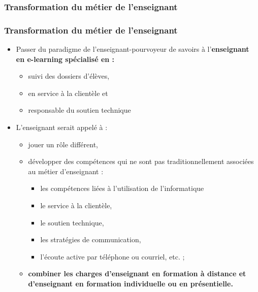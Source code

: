 					\subsubsection{Transformation du métier de l'enseignant} 
						\begin{frame}[allowframebreaks]
						\frametitle{Transformation du métier de l'enseignant}
                        			
                        			\begin{itemize}
                        			\item Passer du paradigme de l’enseignant-pourvoyeur de savoirs à l’\textbf{enseignant en e-learning spécialisé en :}
                        				\begin{itemize}
                        				\item suivi des dossiers d’élèves, 
                        				\item en service à la clientèle et 
                        				\item responsable du soutien technique 
                        				\end{itemize}
                        			\item L’enseignant serait appelé à :
                        				\begin{itemize}
                        				\item jouer un rôle différent, 
                        				\item développer des compétences qui ne sont pas traditionnellement associées au métier d’enseignant : 
                        					\begin{itemize}
                        					\item les compétences liées à l’utilisation de l’informatique
                        					\item le service à la clientèle, 
                        					\item le soutien technique, 
                        					\item les stratégies de communication, 
                        					\item l’écoute active par téléphone ou courriel, etc. ;
                        					\end{itemize}
                        				\item \textbf {combiner les charges d’enseignant en formation à distance et d’enseignant en formation individuelle ou en présentielle.}
                        			\end{itemize}
						\end{itemize}
						\end{frame}		
					
